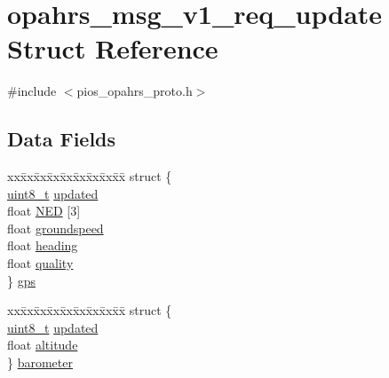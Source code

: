 \hypertarget{structopahrs__msg__v1__req__update}{\section{opahrs\-\_\-msg\-\_\-v1\-\_\-req\-\_\-update Struct Reference}
\label{structopahrs__msg__v1__req__update}
}


{\ttfamily \#include $<$pios\-\_\-opahrs\-\_\-proto.\-h$>$}

\subsection*{Data Fields}
\begin{DoxyCompactItemize}
\item 
\begin{tabbing}
xx\=xx\=xx\=xx\=xx\=xx\=xx\=xx\=xx\=\kill
struct \{\\
\>\hyperlink{stdint_8h_aba7bc1797add20fe3efdf37ced1182c5}{uint8\_t} \hyperlink{structopahrs__msg__v1__req__update_a5b12c6e7691246a958b43e1e3a09d60c}{updated}\\
\>float \hyperlink{structopahrs__msg__v1__req__update_aad52a264ec55e4337d5b1910f48cca03}{NED} \mbox{[}3\mbox{]}\\
\>float \hyperlink{structopahrs__msg__v1__req__update_a25d172d1b353aa54d3421cec66d12691}{groundspeed}\\
\>float \hyperlink{structopahrs__msg__v1__req__update_a485a3a06803f07b829a5dbc73907af17}{heading}\\
\>float \hyperlink{structopahrs__msg__v1__req__update_a5605f0597d2a4b529d0c442d271c0c59}{quality}\\
\} \hyperlink{structopahrs__msg__v1__req__update_a01d304b5741159f75a7a0b061c3b5bfa}{gps}\\

\end{tabbing}\item 
\begin{tabbing}
xx\=xx\=xx\=xx\=xx\=xx\=xx\=xx\=xx\=\kill
struct \{\\
\>\hyperlink{stdint_8h_aba7bc1797add20fe3efdf37ced1182c5}{uint8\_t} \hyperlink{structopahrs__msg__v1__req__update_a5b12c6e7691246a958b43e1e3a09d60c}{updated}\\
\>float \hyperlink{structopahrs__msg__v1__req__update_acc0659ea2d77b607cbe65b422e47aaa0}{altitude}\\
\} \hyperlink{structopahrs__msg__v1__req__update_a947a1e1b5bbf1f1ad7b64382299a96fb}{barometer}\\

\end{tabbing}\end{DoxyCompactItemize}


